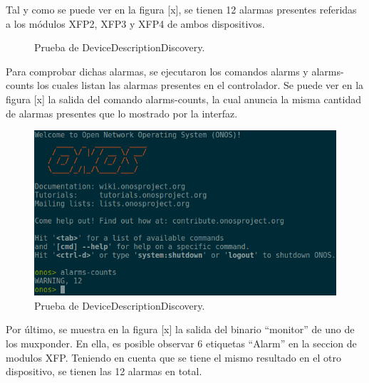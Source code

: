   Tal y como se puede ver en la figura [x], se tienen 12 alarmas presentes referidas a los módulos XFP2, XFP3 y XFP4 de ambos dispositivos.

  \begin{figure}[H]
	\centering
	\caption{Prueba de DeviceDescriptionDiscovery.}
	\label{fig:test2}
  \end{figure}

  Para comprobar dichas alarmas, se ejecutaron los comandos alarms y alarms-counts los cuales listan las alarmas presentes en el controlador. Se puede ver en la figura [x] la salida del comando alarms-counts, la cual anuncia la misma cantidad de alarmas presentes que lo mostrado por la interfaz.

  \begin{figure}[H]
	\centering
	\includegraphics[scale=0.5]{Figures/test7_2.png}
	\caption{Prueba de DeviceDescriptionDiscovery.}
	\label{fig:test2}
  \end{figure}

  Por último, se muestra en la figura [x] la salida del binario “monitor” de uno de los muxponder. En ella, es posible observar 6 etiquetas “Alarm” en la seccion de modulos XFP. Teniendo en cuenta que se tiene el mismo resultado en el otro dispositivo, se tienen las 12 alarmas en total.

